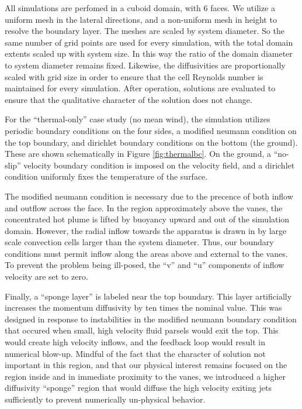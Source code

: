 %
%


All simulations are perfomed in a cuboid domain, with 6 faces. We
utilize a uniform mesh in the lateral directions, and a non-uniform mesh
in height to resolve the boundary layer. The meshes are scaled by system
diameter. So the same number of grid points are used for every
simulation, with the total domain extents scaled up with system size. In
this way the ratio of the domain diameter to system diameter remains
fixed. Likewise, the diffusivities are proportionally scaled with grid
size in order to ensure that the cell Reynolds number is maintained for
every simulation. After operation, solutions are evaluated to ensure
that the qualitative character of the solution does not change. 


%
%

For the ``thermal-only'' case study (no mean wind), the simulation
utilizes periodic boundary conditions on the four sides, a modified
neumann condition on the top boundary, and dirichlet boundary conditions
on the bottom (the ground). These are shown schematically in Figure
\ref{fig:thermalbc}. On the ground, a ``no-slip'' velocity boundary
condition is imposed on the velocity field, and a dirichlet condition
uniformly fixes the temperature of the surface. 

The modified neumann condition is necessary due to the precence of both
inflow and outflow across the face. In the region approximately above
the vanes, the concentrated hot plume is lifted by buoyancy
upward and out of the simulation domain. However, the radial inflow
towards the apparatus is drawn in by large scale convection cells larger
than the system diameter. Thus, our boundary conditions must permit
inflow along the areas above and external to the vanes. To prevent the
problem being ill-posed, the ``v'' and ``u'' components of inflow
velocity are set to zero. 

Finally, a ``sponge layer'' is labeled near the top boundary. This layer
artificially increases the momentum diffusivity by ten times the nominal
value. This was designed in response to instabilities in the modified
neumann boundary condition that occured when small, high velocity fluid
parsels would exit the top. This would create high velocity inflows, and
the feedback loop would result in numerical blow-up. Mindful of the fact
that the character of solution not important in this region, and that
our physical interest remains focused on the region inside and
in immediate proximity to the vanes, we introduced a higher diffusivity
``sponge'' region that would diffuse the high velocity exiting jets
sufficiently to prevent numerically un-physical behavior. 

